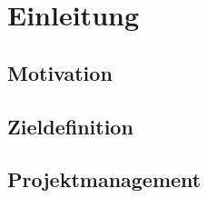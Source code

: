 
\chapter{Einleitung}
\label{sec:Einleitung}
\pagestyle{scrheadings}

\section{Motivation}

\section{Zieldefinition}

\section{Projektmanagement}
